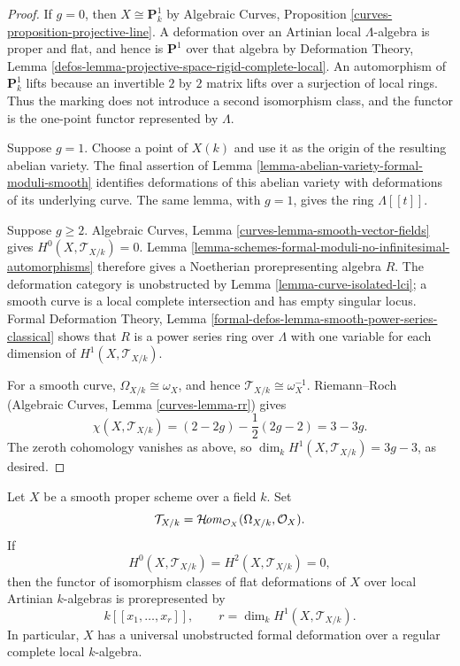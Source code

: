 \begin{proof}
If $g = 0$, then $X \cong \mathbf{P}^1_k$ by Algebraic Curves, Proposition
\ref{curves-proposition-projective-line}. A deformation over an Artinian
local $\Lambda$-algebra is proper and flat, and hence is $\mathbf{P}^1$ over
that algebra by Deformation Theory, Lemma
\ref{defos-lemma-projective-space-rigid-complete-local}. An automorphism of
$\mathbf{P}^1_k$ lifts because an invertible $2$ by $2$ matrix lifts over a
surjection of local rings. Thus the marking does not introduce a second
isomorphism class, and the functor is the one-point functor represented by
$\Lambda$.

Suppose $g = 1$. Choose a point of $X(k)$ and use it as the origin of the
resulting abelian variety. The final assertion of Lemma
\ref{lemma-abelian-variety-formal-moduli-smooth} identifies deformations of
this abelian variety with deformations of its underlying curve. The same
lemma, with $g = 1$, gives the ring $\Lambda[[t]]$.

Suppose $g \geq 2$. Algebraic Curves, Lemma
\ref{curves-lemma-smooth-vector-fields} gives
$H^0(X, \mathcal{T}_{X/k}) = 0$. Lemma
\ref{lemma-schemes-formal-moduli-no-infinitesimal-automorphisms} therefore
gives a Noetherian prorepresenting algebra $R$. The deformation category is
unobstructed by Lemma \ref{lemma-curve-isolated-lci}; a smooth curve is a
local complete intersection and has empty singular locus. Formal Deformation
Theory, Lemma \ref{formal-defos-lemma-smooth-power-series-classical} shows
that $R$ is a power series ring over $\Lambda$ with one variable for each
dimension of $H^1(X, \mathcal{T}_{X/k})$.

For a smooth curve, $\Omega_{X/k} \cong \omega_X$, and hence
$\mathcal{T}_{X/k} \cong \omega_X^{-1}$. Riemann--Roch (Algebraic Curves,
Lemma \ref{curves-lemma-rr}) gives
$$
\chi(X, \mathcal{T}_{X/k})
= (2 - 2g) - \frac{1}{2}(2g - 2) = 3 - 3g.
$$
The zeroth cohomology vanishes as above, so
$\dim_k H^1(X, \mathcal{T}_{X/k}) = 3g - 3$, as desired.
\end{proof}

\begin{lemma}
\label{lemma-proper-smooth-formal-moduli-unobstructed}
\begin{reference}
\cite[Expos\'e 182, Th\'eor\`eme 10, p. 209]{FGA}
\end{reference}
Let $X$ be a smooth proper scheme over a field $k$. Set
$$
\mathcal{T}_{X/k} =
\mathop{\mathcal{H}\!\mathit{om}}\nolimits_{\mathcal{O}_X}(\Omega_{X/k}, \mathcal{O}_X).
$$
If
$$
H^0(X, \mathcal{T}_{X/k}) = H^2(X, \mathcal{T}_{X/k}) = 0,
$$
then the functor of isomorphism classes of flat deformations of $X$ over
local Artinian $k$-algebras is prorepresented by
$$
k[[x_1, \ldots, x_r]],
\qquad r = \dim_k H^1(X, \mathcal{T}_{X/k}).
$$
In particular, $X$ has a universal unobstructed formal deformation over a
regular complete local $k$-algebra.
\end{lemma}

